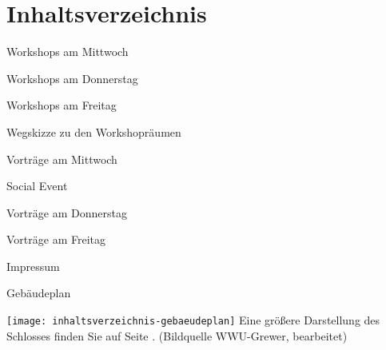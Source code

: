 \section*{Inhaltsverzeichnis}
\label{inhaltsverzeichnis}

\vspace*{0.35em}%
\noindent Workshops am Mittwoch \dotfill \pageref{mittwoch-workshops}

\vspace*{0.35em}%
\noindent Workshops am Donnerstag \dotfill \pageref{donnerstag-workshops}

\vspace*{0.35em}%
\noindent Workshops am Freitag \dotfill \pageref{freitag-workshops}


\vspace*{0.35em}%
\noindent Wegskizze zu den Workshopräumen \dotfill {}

\vspace*{0.35em}%
\noindent Vorträge am Mittwoch \dotfill \pageref{mittwoch}

\vspace*{0.35em}%
\noindent Social Event \dotfill \pageref{social-event}

\vspace*{0.35em}%
\noindent Vorträge am Donnerstag \dotfill \pageref{donnerstag}

\vspace*{0.35em}%
\noindent Vorträge am Freitag \dotfill \pageref{freitag}

\vspace*{0.35em}%
\noindent Impressum \dotfill \pageref{impressum}

\vspace*{0.35em}%
\noindent Gebäudeplan \dotfill \pageref{gebaeudeplan}

\begin{center}
	\texttt{[image: inhaltsverzeichnis-gebaeudeplan]}
\noindent Eine größere Darstellung des Schlosses finden Sie auf Seite \pageref{gebaeudeplan}.
{\small(Bildquelle WWU-Grewer, bearbeitet) }
\end{center}